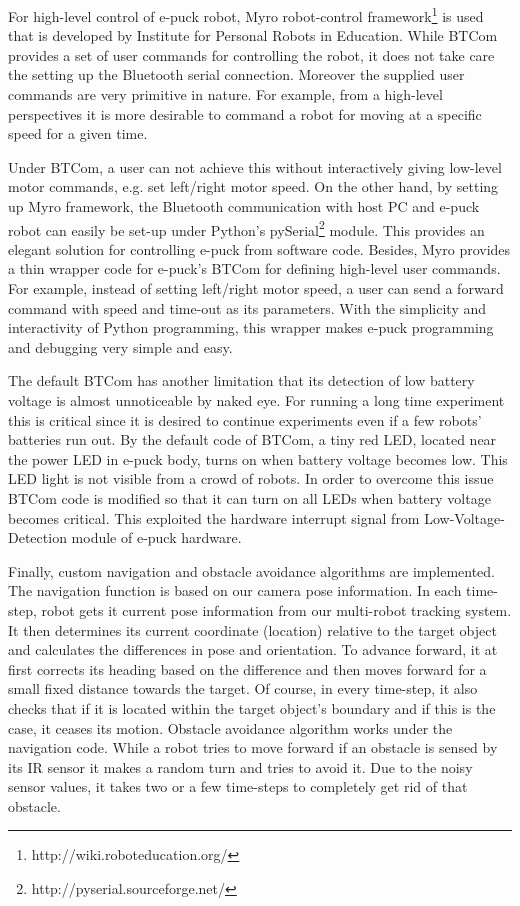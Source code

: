 For high-level control of e-puck robot,  Myro robot-control framework\footnote{http://wiki.roboteducation.org/} is used that is developed by Institute for Personal Robots in Education. While BTCom provides a set of user commands for controlling the robot, it does not take care the setting up the Bluetooth serial connection. Moreover the supplied user commands are very primitive in nature. For example, from a high-level perspectives it is more desirable to command a robot for moving at a specific speed for a given time.

Under BTCom, a user can not achieve this without interactively giving low-level motor commands, e.g. set left/right motor speed. On the other hand, by setting up Myro framework, the Bluetooth communication with host PC and e-puck robot can easily be set-up under Python's pySerial\footnote{http://pyserial.sourceforge.net/} module. This provides an elegant solution for controlling e-puck from software code. Besides, Myro provides a thin wrapper code for e-puck's BTCom for defining high-level user commands. For example, instead of setting left/right motor speed, a user can send a forward command with speed and time-out as its parameters. With the simplicity and interactivity of Python programming, this wrapper makes e-puck programming and debugging very simple and easy.

The default BTCom has another limitation that its detection of low battery voltage is almost unnoticeable by naked eye. For running a long time experiment this is critical since it is desired to continue experiments even if a few robots' batteries run out. By the default code of BTCom, a tiny red LED, located near the power LED in e-puck body, turns on when battery voltage becomes low. This LED light is not visible from a crowd of robots. In order to overcome this issue  BTCom code is modified so that it can turn on all LEDs when battery voltage becomes critical. This exploited the hardware interrupt signal from Low-Voltage-Detection module of e-puck hardware.

Finally, custom navigation and obstacle avoidance algorithms are implemented. The navigation function is based on our camera pose information. In each time-step, robot gets it current pose information from our multi-robot tracking system. It then determines its current coordinate (location) relative to the target object and calculates the differences in pose and orientation. To advance forward, it at first corrects its heading based on the difference and then moves forward for a small fixed distance towards the target. Of course, in every time-step, it also checks that if it is located within the target object's boundary and if this is the case, it ceases its motion. Obstacle avoidance algorithm works under the navigation code. While a robot tries to move forward if an obstacle is sensed by its IR sensor it makes a random turn and tries to avoid it. Due to the noisy sensor values, it takes two or a few time-steps to completely get rid of that obstacle.
